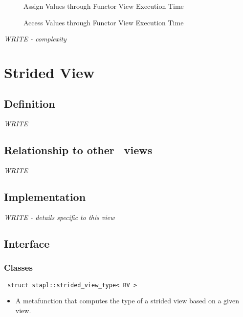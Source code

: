 \begin{figure}[p]
\caption{Assign Values through Functor View Execution Time}
\label{fig:fun-vw-assign-exper}
\end{figure}

\begin{figure}[p]
\caption{Access Values through Functor View Execution Time}
\label{fig:fun-vw-access-exper}
\end{figure}

\emph{WRITE - complexity}


\section{Strided View} \label{sec-str-vw}

\subsection{Definition}

\textit{WRITE}

\subsection{Relationship to other \stapl\ views}

\textit{WRITE}

\subsection{Implementation}

\textit{WRITE - details specific to this view}

\subsection{Interface} \label{sec-str-vw-inter}

\subsubsection{Classes}

\noindent
\texttt{%
struct stapl::strided\_view\_type< BV >
}

\begin{itemize}
\item
A metafunction that computes the type of a strided view based on a given view.
\end{itemize}

